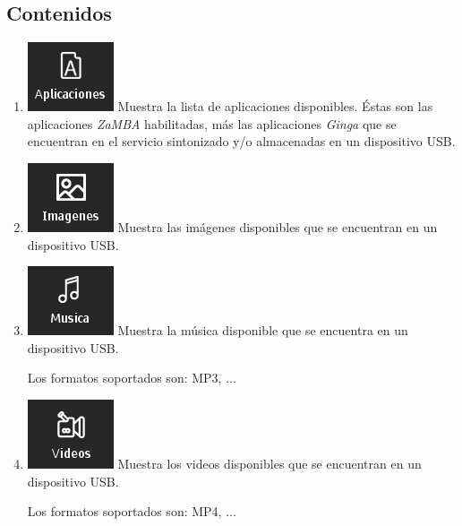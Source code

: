 \documentclass{article}
\begin{document}
\subsection{Contenidos} 
	\begin{enumerate}[label*=\arabic*.]
	\item \includegraphics[scale=0.60,keepaspectratio=true]{apps} Muestra la lista de aplicaciones disponibles. Éstas son las aplicaciones \textit{ZaMBA} habilitadas, más las aplicaciones \textit{Ginga} que se encuentran en el servicio sintonizado y/o almacenadas en un dispositivo USB.
	\item \includegraphics[scale=0.60,keepaspectratio=true]{images} Muestra las imágenes disponibles que se encuentran en un dispositivo USB.
	\item \includegraphics[scale=0.60,keepaspectratio=true]{music} Muestra la música disponible que se encuentra en un dispositivo USB.
	
Los formatos soportados son: MP3, ...
	\item \includegraphics[scale=0.60,keepaspectratio=true]{videos} Muestra los videos disponibles que se encuentran en un dispositivo USB.
		
Los formatos soportados son: MP4, ...
	\end{enumerate}
\end{document}
